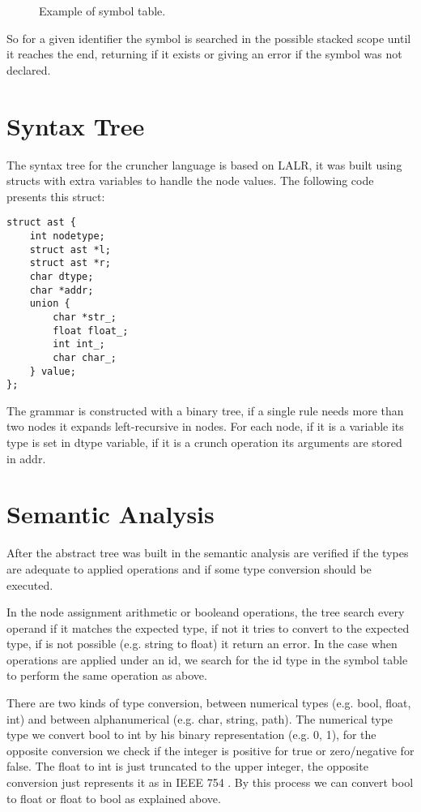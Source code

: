 \documentclass{article}
\begin{document}
\begin{figure}[ht]
\caption{Example of symbol table.}
\end {figure}

So for a given identifier the symbol is searched in the possible stacked scope
until it reaches the end, returning if it exists or giving an error if the
symbol was not declared.

\section{Syntax Tree}%
\label{sec:syntax}
The syntax tree for the cruncher language is based on LALR, it was built using
structs with extra variables to handle the node values. The following code
presents this struct:

\begin{verbatim}
struct ast {
    int nodetype;
    struct ast *l;
    struct ast *r;
    char dtype;
    char *addr;
    union {
        char *str_;
        float float_;
        int int_;
        char char_;
    } value;
};
\end{verbatim}

The grammar is constructed with a binary tree, if a single rule needs more than
two nodes it expands left-recursive in nodes. For each node, if it is a
variable its type is set in dtype variable, if it is a crunch operation its
arguments are stored in addr.

\section{Semantic Analysis}
After the abstract tree was built in the semantic analysis are verified if the
types are adequate to applied operations and if some type conversion should be
executed.

In the node assignment arithmetic or booleand operations, the tree search every
operand if it matches the expected type, if not it tries to convert to the
expected type, if is not possible (e.g. string to float) it return an error.
In the case when operations are applied under an id, we search for the id type
in the symbol table to perform the same operation as above.

There are two kinds of type conversion, between numerical types (e.g. bool,
float, int) and between alphanumerical (e.g. char, string, path). The numerical
type type we convert bool to int by his binary representation (e.g. 0, 1), for
the opposite conversion we check if the integer is positive for true or
zero/negative for false. The float to int is just truncated to the upper
integer, the opposite conversion just represents it as in IEEE 754
\cite{ieee754}. By this process we can convert bool to float or float to bool
as explained above.
\end{document}
